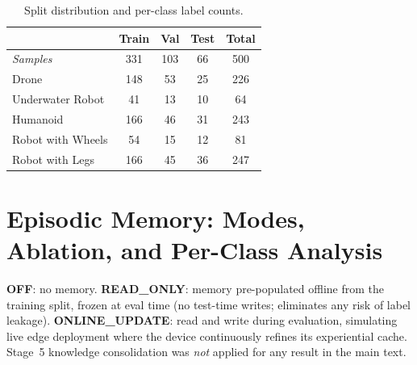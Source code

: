 \documentclass[runningheads]{llncs}
\begin{document}
\begin{table}[ht]
\centering
\caption{Split distribution and per-class label counts.}
\label{tab:dataset-full}
\setlength{\tabcolsep}{5pt}
\begin{tabular}{lcccc}
\toprule
 & \textbf{Train} & \textbf{Val} & \textbf{Test} & \textbf{Total} \\
\midrule
\textit{Samples}      & 331 & 103 & 66  & 500 \\
\midrule
Drone                 & 148 &  53 &  25 & 226 \\
Underwater Robot      &  41 &  13 &  10 &  64 \\
Humanoid              & 166 &  46 &  31 & 243 \\
Robot with Wheels     &  54 &  15 &  12 &  81 \\
Robot with Legs       & 166 &  45 &  36 & 247 \\
\bottomrule
\end{tabular}
\end{table}



\section{Episodic Memory: Modes, Ablation, and Per-Class Analysis}
\label{sec:supp-memory}

\noindent\textbf{OFF}: no memory.
\textbf{READ\_ONLY}: memory pre-populated offline from the training split, frozen at eval time (no test-time writes; eliminates any risk of label leakage).
\textbf{ONLINE\_UPDATE}: read and write during evaluation, simulating live edge deployment where the device continuously refines its experiential cache.
Stage~5 knowledge consolidation was \emph{not} applied for any result in the main text.

\begin{table}[ht]
\centering
\caption{Memory mode ablation across all tasks. Robot Sel.: 250 samples; VERI: 200; GEO: 3,001.}
\label{tab:mem-ablation}
\setlength{\tabcolsep}{4pt}

\end{table}
\end{document}
